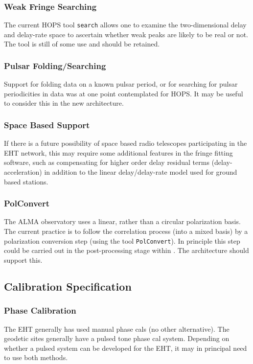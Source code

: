 \subsubsection{Weak Fringe Searching}
\label{sec:search}
The current HOPS tool \texttt{search} allows one to examine the two-dimensional
delay and delay-rate space to ascertain whether weak peaks are likely to be
real or not.  The tool is still of some use and should be retained.

\subsubsection{Pulsar Folding/Searching}
\label{sec:pulsar}
Support for folding data on a known pulsar period, or for searching
for pulsar periodicities in data was at one point contemplated for HOPS.
It may be useful to consider this in the new architecture.

\subsubsection{Space Based Support}
\label{sec:space}

If there is a future possibility of space based radio telescopes participating in the EHT network, this may require some additional features in the fringe fitting software, such
as compensating for higher order delay residual terms (delay-acceleration) in addition to the linear delay/delay-rate model used for ground based stations.

\subsubsection{PolConvert}
\label{sec:polconvert}
The ALMA observatory uses a linear, rather than a circular polarization
basis.  The current practice is to follow the correlation process (into
a mixed basis) by a polarization conversion step (using the tool
\texttt{PolConvert}).  In principle this step could be carried out in
the post-processing stage within \nuHOPS.  The architecture should
support this.

\subsection{Calibration Specification}
\label{sec:calspecs}

\subsubsection{Phase Calibration}
\label{sec:phasecal}
The EHT generally has used manual phase cals (no other alternative).
The geodetic sites generally have a pulsed tone phase cal system.
Depending on whether a pulsed system can be developed for the EHT,
it may in principal need to use both methods.

